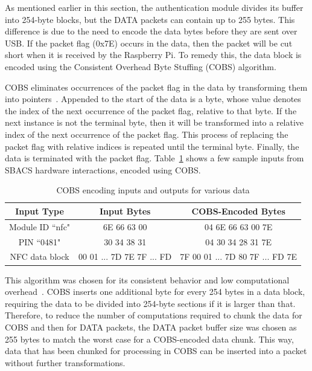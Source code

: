 \documentclass[12pt]{report}
\begin{document}
As mentioned earlier in this section, the authentication module divides its buffer into 254-byte blocks, but the 
DATA packets can contain up to 255 bytes. This difference is due to the need to encode the data bytes before they
are sent over USB. If the packet flag (0x7E) occurs in the data, then the packet will be cut short when it is received by 
the Raspberry Pi. To remedy this, the data block is encoded using the Consistent Overhead Byte Stuffing (COBS) algorithm.

COBS eliminates occurrences of the packet flag in the data by transforming them into pointers~\autocite{COBS}. Appended 
to the start of the data is a byte, whose value denotes the index of the next occurrence of the packet flag, relative to 
that byte. If the next instance is not the terminal byte, then it will be transformed into a relative index of the next 
occurrence of the packet flag. This process of replacing the packet flag with relative indices is repeated until the 
terminal byte. Finally, the data is terminated with the packet flag. Table~\ref{tab:cobs-encoding} shows a few sample 
inputs from SBACS hardware interactions, encoded using COBS.

\begin{table}[!h]
    \begin{tabular}{|c|c|c|} \hline
        Input Type & Input Bytes & COBS-Encoded Bytes \\ \hline
        Module ID ``nfc" & 6E 66 63 00 & 04 6E 66 63 00 7E \\ \hline
        PIN ``0481" & 30 34 38 31 & 04 30 34 28 31 7E \\ \hline
        NFC data block & 00 01 ... 7D 7E 7F ... FD & 7F 00 01 ... 7D 80 7F ... FD 7E \\ \hline
    \end{tabular}
    \caption{COBS encoding inputs and outputs for various data}
    \label{tab:cobs-encoding}
\end{table}

This algorithm was chosen for its consistent behavior and low computational overhead~\autocite{COBS}. COBS inserts one 
additional byte for every 254 bytes in a data block, requiring the data to be divided into 254-byte sections if it is 
larger than that. Therefore, to reduce the number of computations required to chunk the data for COBS and then for DATA 
packets, the DATA packet buffer size was chosen as 255 bytes to match the worst case for a COBS-encoded data chunk. 
This way, data that has been chunked for processing in COBS can be inserted into a packet without further 
transformations.
\end{document}
